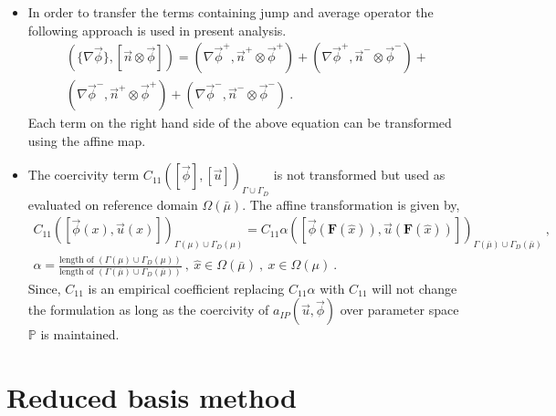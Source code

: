 \documentclass[graybox]{svmult}
\begin{document}
\begin{itemize}
\item In order to transfer the terms containing jump and average operator the following approach is used in present analysis.
\begin{equation*}\label{jump_average_term_split}
\begin{split}
\left(\lbrace \nabla \overrightarrow{\phi} \rbrace , \left[ \overrightarrow{n} \otimes \overrightarrow{\phi}  \right]  \right) = \left( \nabla \overrightarrow{\phi}^+ , \overrightarrow{n}^+ \otimes \overrightarrow{\phi}^+ \right) + \left( \nabla \overrightarrow{\phi}^+ , \overrightarrow{n}^- \otimes \overrightarrow{\phi}^- \right) + \\ 
\left( \nabla \overrightarrow{\phi}^- , \overrightarrow{n}^+ \otimes \overrightarrow{\phi}^+ \right) + \left( \nabla \overrightarrow{\phi}^- , \overrightarrow{n}^- \otimes \overrightarrow{\phi}^- \right) \ .
\end{split}
\end{equation*}
Each term on the right hand side of the above equation can be transformed using the affine map.

\item The coercivity term $C_{11}\left( [\overrightarrow{\phi}],[\overrightarrow{u}] \right)_{\Gamma \cup \Gamma_D}$ is not transformed but used as evaluated on reference domain $\Omega(\bar{\mu})$. The affine transformation is given by,
\begin{equation*}
\begin{split}
C_{11}\left( [\overrightarrow{\phi}(x),\overrightarrow{u}(x)] \right)_{\Gamma(\mu) \cup \Gamma_D(\mu)} = C_{11} \alpha \left( [\overrightarrow{\phi}(\bm{F}(\hat{x})),\overrightarrow{u}(\bm{F}(\hat{x}))] \right)_{\Gamma(\bar{\mu}) \cup \Gamma_D(\bar{\mu})} \ , \\
\alpha = \frac{\text{length of }\left( \Gamma(\mu) \cup \Gamma_D(\mu)\right)}{\text{length of }\left( \Gamma(\bar{\mu}) \cup \Gamma_D(\bar{\mu})\right)} \ , \ \hat{x} \in \Omega(\bar{\mu}) \ , \ x \in \Omega(\mu) \ .
\end{split}
\end{equation*}
Since, $C_{11}$ is an empirical coefficient replacing $C_{11} \alpha$ with $C_{11}$ will not change the formulation as long as the coercivity of $a_{IP}(\overrightarrow{u},\overrightarrow{\phi}) $ over parameter space $\mathbb{P}$ is maintained.
\end{itemize}

\section{Reduced basis method}\label{rb_section}
\end{document}

